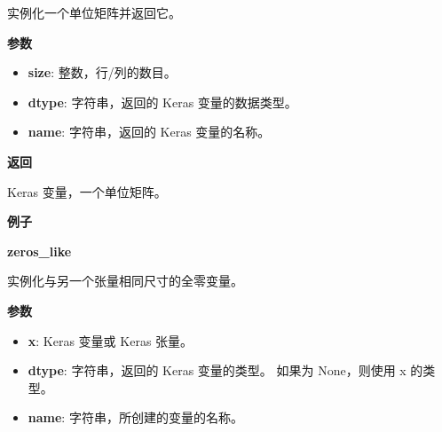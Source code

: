 实例化一个单位矩阵并返回它。

\textbf{参数}

\begin{itemize}
\tightlist
\item
  \textbf{size}: 整数，行/列的数目。
\item
  \textbf{dtype}: 字符串，返回的 Keras 变量的数据类型。
\item
  \textbf{name}: 字符串，返回的 Keras 变量的名称。
\end{itemize}

\textbf{返回}

Keras 变量，一个单位矩阵。

\textbf{例子}

\begin{Shaded}
\begin{Highlighting}[]
\OperatorTok{>>>}    
\OperatorTok{>>>} \OperatorTok{=} \NormalTok{)}
\OperatorTok{>>>} 
\NormalTok{array([[ }\NormalTok{.],}
       \NormalTok{[ }\NormalTok{.],}
       \NormalTok{[ }\NormalTok{.]], dtype}\OperatorTok{=}
\end{Highlighting}
\end{Shaded}


\textbf{zeros\_like}\label{zerosux5flike}

\begin{Shaded}
\begin{Highlighting}[]
\OperatorTok{=}\OperatorTok{=}\NormalTok{)}
\end{Highlighting}
\end{Shaded}

实例化与另一个张量相同尺寸的全零变量。

\textbf{参数}

\begin{itemize}
\tightlist
\item
  \textbf{x}: Keras 变量或 Keras 张量。
\item
  \textbf{dtype}: 字符串，返回的 Keras 变量的类型。 如果为 None，则使用
  x 的类型。
\item
  \textbf{name}: 字符串，所创建的变量的名称。
\end{itemize}

